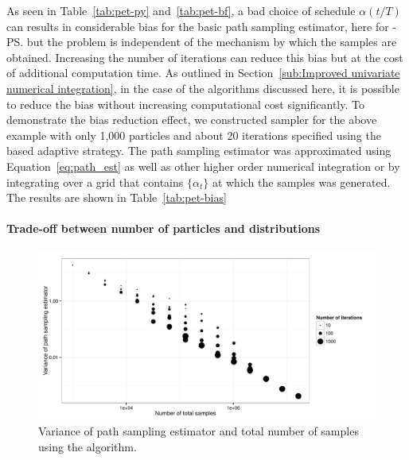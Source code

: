 

As seen in Table~\ref{tab:pet-py} and~\ref{tab:pet-bf}, a bad choice of
schedule $\alpha(t/T)$ can results in considerable bias for the basic path
sampling estimator, here for \smc[2]-\ps but the problem is independent of the
mechanism by which the samples are obtained. Increasing the number of
iterations can reduce this bias but at the cost of additional computation
time. As outlined in Section~\ref{sub:Improved univariate numerical
  integration}, in the case of the \smc algorithms discussed here, it is
possible to reduce the bias without increasing computational cost
significantly. To demonstrate the bias reduction effect, we constructed \smc
sampler for the above \pet example with only 1,000 particles and about 20
iterations specified using the \cess based adaptive strategy. The path
sampling estimator was approximated using Equation~\eqref{eq:path_est} as well
as other higher order numerical integration or by integrating over a grid that
contains $\{\alpha_t\}$ at which the samples was generated. The results are
shown in Table~\ref{tab:pet-bias}

\paragraph{Trade-off between number of particles and distributions}

\begin{figure}[t]
  \includegraphics[width=\linewidth]{fig/Particle_Iter_Var}
  \caption[Variance of path sampling estimator and total number of samples
  using \protect\smc algorithm]
  {Variance of path sampling estimator and total number of samples
    using the \smc[2] algorithm.}
  \label{fig:particle iter num}
\end{figure}

